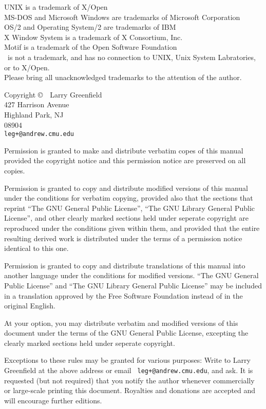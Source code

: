 \noindent UNIX is a trademark of X/Open\\
MS-DOS and Microsoft Windows are trademarks of Microsoft Corporation\\
OS/2 and Operating System/2 are trademarks of IBM\\
X Window System is a trademark of X Consortium, Inc.\\
Motif is a trademark of the Open Software Foundation\\
\linux\ is not a trademark, and has no connection to
UNIX, Unix System Labratories, or to X/Open.\\
Please bring all unacknowledged trademarks to the attention of the author.
\vspace*{\fill}

\noindent
Copyright \copyright \ \years \ Larry Greenfield\\
427 Harrison Avenue\\Highland Park, NJ\\08904\\
{\tt leg+@andrew.cmu.edu}

\vspace{.2in}\noindent
Permission is granted to make and distribute verbatim copes of this
manual provided the copyright notice and this permission notice are
preserved on all copies.

\noindent
Permission is granted to copy and distribute modified versions of this
manual under the conditions for verbatim copying, provided also that
the sections that reprint ``The GNU General Public License'', ``The
GNU Library General Public License'', and other clearly marked
sections held under seperate copyright are reproduced under the
conditions given within them, and provided that the entire resulting
derived work is distributed under the terms of a permission notice
identical to this one.

\noindent 
Permission is granted to copy and distribute translations of
this manual into another language under the conditions for modified
versions.  ``The GNU General Public License'' and ``The GNU Library
General Public License'' may be included in a translation approved by
the Free Software Foundation instead of in the original English.

\noindent
At your option, you may distribute verbatim and modified versions of
this document under the terms of the GNU General Public License,
excepting the clearly marked sections held under seperate copyright.

Exceptions to these rules may be granted for various purposes: Write
to Larry Greenfield at the above address or email {\tt
  leg+@andrew.cmu.edu}, and ask.  It is requested (but not
required) that you notify the author whenever commercially or
large-scale printing this document.  Royalties and donations are
accepted and will encourage further editions.


